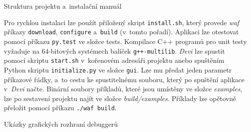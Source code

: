 \documentclass[czech,bachelor,male,python,dept460,hidelinks]{diploma}						%
\newcommand{\parspace}[1][]{
	\ifthenelse{\isempty{#1}}{\vspace{0mm}}{\vspace{#1}}
	\par
}
\begin{document}
\begin{section}{Struktura projektu a~instalační manuál}
	\parspace Pro rychlou instalaci lze použít přiložený skript \texttt{install.sh}, který provede \textit{waf} příkazy \texttt{download}, \texttt{configure}
	a~\texttt{build} (v~tomto pořadí).
	Aplikaci lze otestovat pomocí příkazu \texttt{py.test} ve složce tests. Kompilace C++ programů pro unit testy vyžaduje na 64-bitových systémech
	balíček \texttt{g++-multilib}.
	\textit{Devi} lze spustit pomocí skriptu \texttt{start.sh} v~kořenovém adresáři projektu anebo spuštěním Python skriptu \texttt{initialize.py}
	ve složce \texttt{gui}. Lze mu předat jeden parametr příkazové řádky, a~to cestu ke spustitelnému souboru, který po spuštění aplikace v~\textit{Devi} načte.
	Binární soubory příkladů, které jsou umístěny ve složce \textit{examples}, lze po sestavení projektu najít ve složce \textit{build/examples}.
	Příklady lze opětovně přeložit pomocí příkazu \texttt{./waf build}.
\end{section}

\begin{section}{Ukázky grafických rozhraní debuggerů}
\label{appendix:gui}
\end{section}

\clearpage
\end{document}
